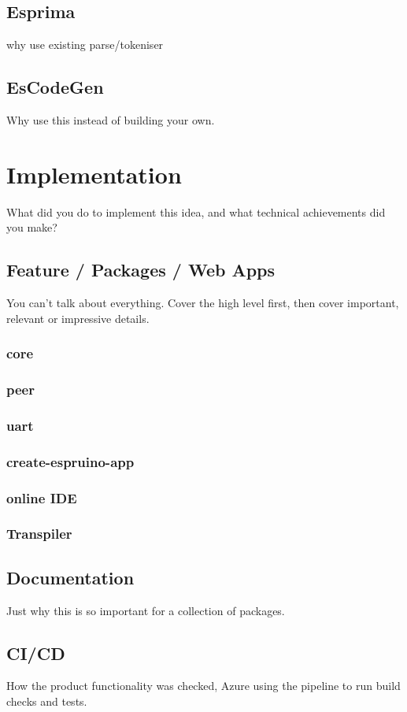 \documentclass{l4proj}
\begin{document}
\section{Esprima}
\text why use existing parse/tokeniser
\section{EsCodeGen}
\text Why use this instead of building your own.
\chapter{Implementation}
What did you do to implement this idea, and what technical achievements did you make?
\section{Feature / Packages / Web Apps}
You can't talk about everything. Cover the high level first, then cover important, relevant or impressive details.
\subsection{core}
\subsection{peer}
\subsection{uart}
\subsection{create-espruino-app}
\subsection{online IDE}
\subsection{Transpiler}

\section{Documentation}
\text Just why this is so important for a collection of packages.
\section{CI/CD}
\text How the product functionality was checked, Azure using the pipeline to run build checks and tests.
\end{document}
